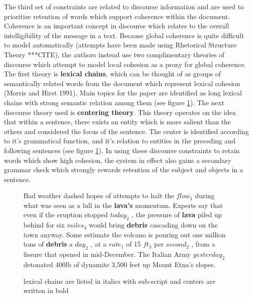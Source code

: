 {The third set of constraints are related to discourse information and are used to prioritize retention of words which support coherence within the document.  Coherence is an important concept in discourse which relates to the overall intelligibility of the message in a text.  Because global coherence is quite difficult to model automatically (attempts have been made using Rhetorical Structure Theory ***CITE), the authors instead use two complimentary theories of discourse which attempt to model local cohesion as a proxy for global coherence.  The first theory is \textbf{lexical chains}, which can be thought of as groups of semantically related words from the document which represent lexical cohesion (Morris and Hirst 1991).  Main topics for the paper are identified as long lexical chains with strong semantic relation among them (see figure \ref{fig:centering}).  The next discourse theory used is \textbf{centering theory}.  This theory operates on the idea that within a sentence, there exists an entity which is more salient than the others and considered the focus of the sentence. The center is identified according to it's grammatical function, and it's relation to entities in the preceding and following sentences (see figure \ref{fig:centering}). In using these discourse constraints to retain words which show high cohesion, the system in effect also gains a secondary grammar check which strongly rewards retention of the subject and objects in a sentence.}


\begin{figure}[H]
\centering
\begin{scriptsize}
Bad weather dashed hopes of attempts to halt the $flow_{1}$ during what was seen as a lull in the \textbf{lava's} momentum. Experts say that even if the eruption stopped $today_{2}$ , the pressure of \textbf{lava} piled up behind for six $miles_{3}$ would bring \textbf{debris} cascading down on the town anyway. Some estimate the volcano is pouring out one million tons of \textbf{debris} a $day_{2}$ , at a $rate_{1}$ of 15 $ft_{3}$ per $second_{2}$ , from a fissure that opened in mid-December.
The Italian Army $yesterday_{2}$ detonated 400lb of dynamite 3,500 feet up Mount Etna’s slopes.
\end{scriptsize}

\caption{lexical chains are listed in italics with sub-script and centers are written in bold}
\label{fig:centering}
\end{figure}

